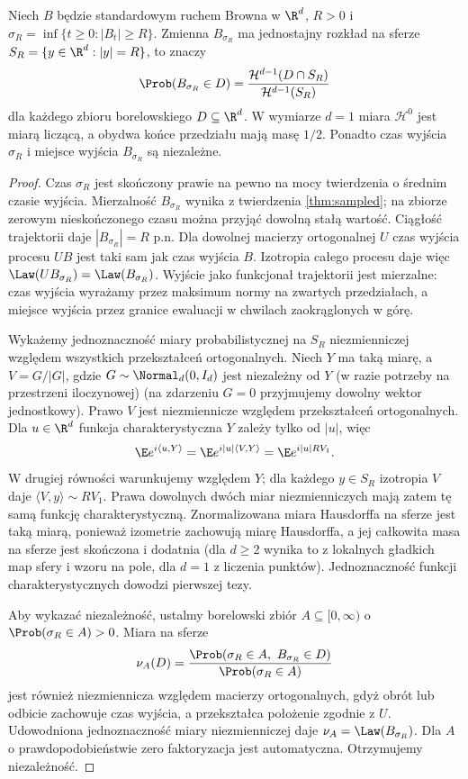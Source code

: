 \begin{twierdzenie}
\label{thm:brown-exit-sphere}
Niech $B$ będzie standardowym ruchem Browna w $\R^d$,
$R>0$ i $\sigma_R=\inf\{t\ge0:|B_t|\ge R\}$.
Zmienna $B_{\sigma_R}$ ma jednostajny rozkład na
sferze $S_R=\{y\in\R^d:|y|=R\}$, to znaczy
\[
\Prob(B_{\sigma_R}\in D)=
\frac{\mathcal H^{d-1}(D\cap S_R)}
{\mathcal H^{d-1}(S_R)}
\]
dla każdego zbioru borelowskiego $D\subseteq\R^d$.
W wymiarze $d=1$ miara $\mathcal H^0$ jest miarą
liczącą, a obydwa końce przedziału mają masę $1/2$.
Ponadto czas wyjścia $\sigma_R$ i miejsce wyjścia
$B_{\sigma_R}$ są niezależne.
\end{twierdzenie}
\begin{proof}
Czas $\sigma_R$ jest skończony prawie na pewno
na mocy twierdzenia o średnim czasie wyjścia.
Mierzalność $B_{\sigma_R}$ wynika z twierdzenia
\ref{thm:sampled}; na zbiorze zerowym nieskończonego
czasu można przyjąć dowolną stałą wartość.
Ciągłość trajektorii daje $|B_{\sigma_R}|=R$ p.n.
Dla dowolnej macierzy ortogonalnej $U$ czas wyjścia
procesu $UB$ jest taki sam jak czas wyjścia $B$.
Izotropia całego procesu daje więc
$\Law(UB_{\sigma_R})=\Law(B_{\sigma_R})$.
Wyjście jako funkcjonał trajektorii jest mierzalne:
czas wyjścia wyrażamy przez maksimum normy na
zwartych przedziałach, a miejsce wyjścia przez
granice ewaluacji w chwilach zaokrąglonych w górę.

Wykażemy jednoznaczność miary probabilistycznej
na $S_R$ niezmienniczej względem wszystkich
przekształceń ortogonalnych. Niech $Y$ ma taką miarę,
a $V=G/|G|$, gdzie $G\sim\Normal_d(0,I_d)$ jest
niezależny od $Y$ (w razie potrzeby na przestrzeni
iloczynowej) (na zdarzeniu $G=0$ przyjmujemy
dowolny wektor jednostkowy). Prawo $V$ jest
niezmiennicze względem przekształceń ortogonalnych.
Dla $u\in\R^d$ funkcja charakterystyczna $Y$
zależy tylko od $|u|$, więc
\[
\E e^{i\langle u,Y\rangle}
=\E e^{i|u|\langle V,Y\rangle}
=\E e^{i|u|R V_1}.
\]
W drugiej równości warunkujemy względem $Y$;
dla każdego $y\in S_R$ izotropia $V$ daje
$\langle V,y\rangle\sim R V_1$.
Prawa dowolnych dwóch miar niezmienniczych mają
zatem tę samą funkcję charakterystyczną.
Znormalizowana miara Hausdorffa na sferze
jest taką miarą, ponieważ izometrie zachowują
miarę Hausdorffa, a jej całkowita masa na sferze
jest skończona i dodatnia (dla $d\ge2$ wynika to
z lokalnych gładkich map sfery i wzoru na pole,
dla $d=1$ z liczenia punktów).
Jednoznaczność funkcji charakterystycznych dowodzi
pierwszej tezy.

Aby wykazać niezależność, ustalmy borelowski zbiór
$A\subseteq[0,\infty)$ o $\Prob(\sigma_R\in A)>0$.
Miara na sferze
\[
\nu_A(D)=
\frac{\Prob(\sigma_R\in A,\ B_{\sigma_R}\in D)}
{\Prob(\sigma_R\in A)}
\]
jest również niezmiennicza względem macierzy
ortogonalnych, gdyż obrót lub odbicie zachowuje
czas wyjścia, a przekształca położenie zgodnie z $U$.
Udowodniona jednoznaczność miary niezmienniczej
daje $\nu_A=\Law(B_{\sigma_R})$.
Dla $A$ o prawdopodobieństwie zero faktoryzacja
jest automatyczna. Otrzymujemy niezależność.
\end{proof}

